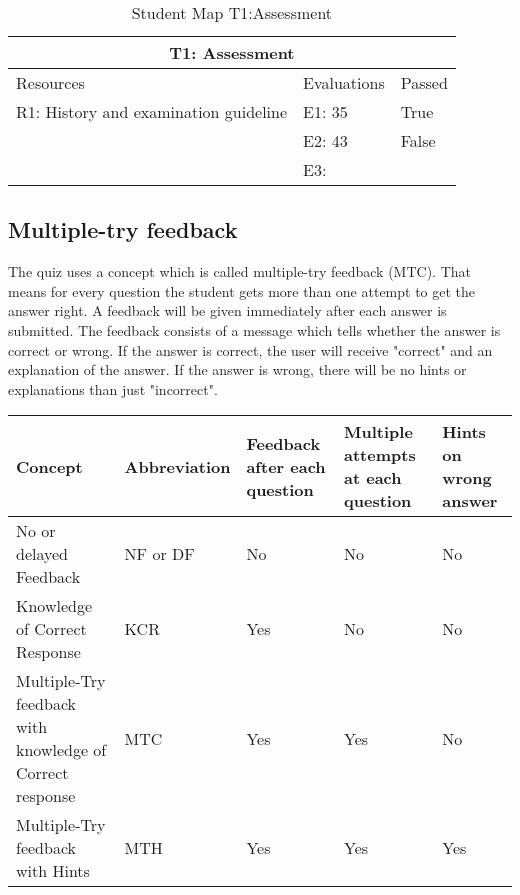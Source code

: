 \begin{table}[h!]
	\caption{Student Map T1:Assessment}
	\label{table:StudentMap}
	\begin{tabular}{ | m{16em} | m{10em}| m{6em} | } 
		\hline
		\multicolumn{3}{c}{\bfseries T1: Assessment} \\
		\hline
		Resources & Evaluations & Passed \\
		\hline
		R1: History and examination guideline & E1: 35 & True \\
		& E2: 43 & False \\
		& E3: &  \\
		\hline
	\end{tabular}
\end{table}




\subsection{Multiple-try feedback}
The quiz uses a concept which is called multiple-try feedback (MTC). That means for every question the student gets more than one attempt to get the answer right. A feedback will be given immediately after each answer is submitted. The feedback consists of a message which tells whether the answer is correct or wrong. If the answer is correct, the user will receive "correct" and an explanation of the answer. If the answer is wrong, there will be no hints or explanations than just "incorrect".

\begin{tabular}{ | m{10em} | m{6em}| m{6em} | m{6em} | m{5em} | } 
	\hline
	Concept & Abbreviation & Feedback after each question & Multiple attempts at each question & Hints on wrong answer \\ [0.5ex]
	\hline
No or delayed Feedback & NF or DF & No & No & No  \\
Knowledge of Correct Response & KCR  & Yes & No & No \\
Multiple-Try feedback with knowledge of Correct response  & MTC & Yes & Yes & No \\
Multiple-Try feedback with Hints & MTH & Yes & Yes & Yes \\
\hline
\end{tabular}

